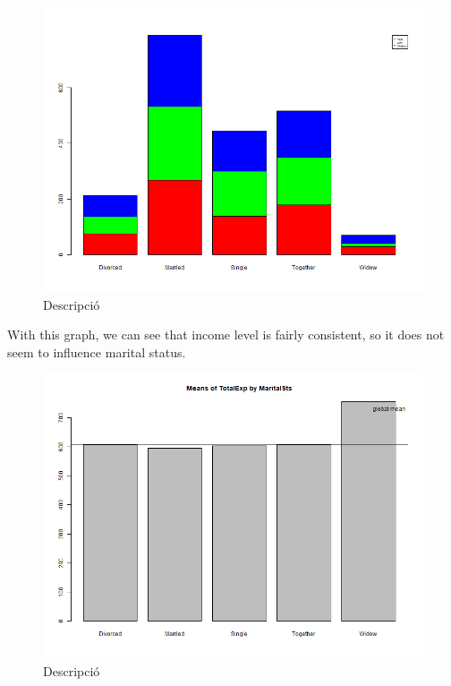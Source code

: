 \begin{figure}[H]
    \centering
    \includegraphics[width= 1\linewidth]{Imatges/stacked_barplot_counts_IncomeSegment_10_legend(marital).png}
    \caption{Descripció}
    \label{fig:scree_plot_5} %
\end{figure}

With this graph, we can see that income level is fairly consistent, so it does not seem to influence marital status.

\begin{figure}[H]
    \centering
    \includegraphics[width= 1\linewidth]{Imatges/mean_barplot_TotalExp(2).png}
    \caption{Descripció}
    \label{fig:scree_plot_5} %
\end{figure}

